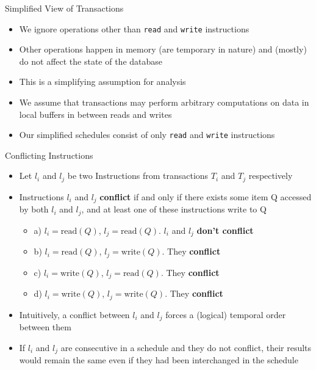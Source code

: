\documentclass[aspectratio=169, xcolor=dvipsnames]{beamer}
\begin{document}
\begin{frame}{Simplified View of Transactions}
    \begin{itemize}[<+->]
        \item We ignore operations other than \texttt{read} and \texttt{write} instructions
        \item Other operations happen in memory (are temporary in nature) and (mostly) do not affect the state of the database
        \item This is a simplifying assumption for analysis
        \item We assume that transactions may perform arbitrary computations on data in local buffers in between reads and writes
        \item Our simplified schedules consist of only \texttt{read} and \texttt{write} instructions
    \end{itemize}
\end{frame}

\begin{frame}{Conflicting Instructions}
    \begin{itemize}[<+->]
        \item Let $l_i$ and $l_j$ be two Instructions from transactions $T_i$ and $T_j$ respectively
        \item Instructions $l_i$ and $l_j$ \textbf{conflict} if and only if there exists some item Q accessed by both $l_i$ and $l_j$, and at least one of these instructions write to Q
        \begin{itemize}[<+->]
            \item a) $l_i = \text{read}(Q)$, $l_j = \text{read}(Q)$. $l_i$ and $l_j$ \textbf{don't conflict}
            \item b) $l_i = \text{read}(Q)$, $l_j = \text{write}(Q)$. They \textbf{conflict}
            \item c) $l_i = \text{write}(Q)$, $l_j = \text{read}(Q)$. They \textbf{conflict}
            \item d) $l_i = \text{write}(Q)$, $l_j = \text{write}(Q)$. They \textbf{conflict}
        \end{itemize}
        \item Intuitively, a conflict between $l_i$ and $l_j$ forces a (logical) temporal order between them
        \item If $l_i$ and $l_j$ are consecutive in a schedule and they do not conflict, their results would remain the same even if they had been interchanged in the schedule
    \end{itemize}
\end{frame}
\end{document}
